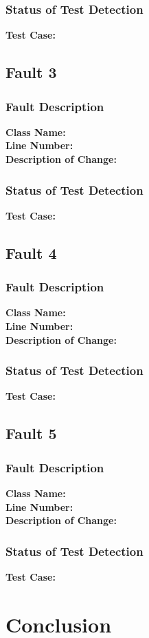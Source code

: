 \documentclass[letterpaper,10pt]{article}
\begin{document}
		\subsubsection{Status of Test Detection}
		\textbf{Test Case: } \\
	\subsection{Fault 3}
		\subsubsection{Fault Description}
		\textbf{Class Name: } \\
		\textbf{Line Number: } \\
		\textbf{Description of Change: } \\
		\subsubsection{Status of Test Detection}
		\textbf{Test Case: } \\
	\subsection{Fault 4}
		\subsubsection{Fault Description}
		\textbf{Class Name: } \\
		\textbf{Line Number: } \\
		\textbf{Description of Change: } \\
		\subsubsection{Status of Test Detection}
		\textbf{Test Case: } \\
	\subsection{Fault 5}
		\subsubsection{Fault Description}
		\textbf{Class Name: } \\
		\textbf{Line Number: } \\
		\textbf{Description of Change: } \\
		\subsubsection{Status of Test Detection}
		\textbf{Test Case: } \\

\section{Conclusion}
\end{document}
